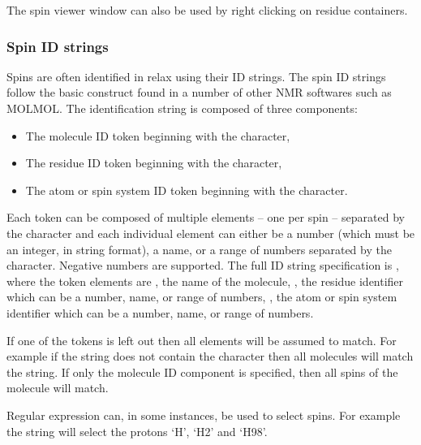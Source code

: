 The spin viewer window can also be used by right clicking on residue containers.



\subsubsection{Spin ID strings} \label{sect: spin ID}

Spins are often identified in relax using their ID strings.  The spin ID strings follow the basic construct found in a number of other NMR softwares such as MOLMOL.  The identification string is composed of three components:

\begin{itemize}
\item The molecule ID token beginning with the \promptstring{\#} character,
\item The residue ID token beginning with the \promptstring{:} character,
\item The atom or spin system ID token beginning with the  character.
\end{itemize}

Each token can be composed of multiple elements -- one per spin -- separated by the \promptstring{,} character and each individual element can either be a number (which must be an integer, in string format), a name, or a range of numbers separated by the \promptstring{-} character.  Negative numbers are supported.  The full ID string specification is , where the token elements are , the name of the molecule, , the residue identifier which can be a number, name, or range of numbers, , the atom or spin system identifier which can be a number, name, or range of numbers.

If one of the tokens is left out then all elements will be assumed to match.  For example if the string does not contain the \promptstring{\#} character then all molecules will match the string.  If only the molecule ID component is specified, then all spins of the molecule will match.

Regular expression can, in some instances, be used to select spins.  For example the string  will select the protons `H', `H2' and `H98'.




